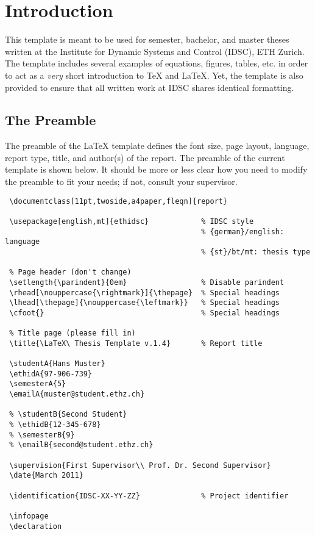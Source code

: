 \chapter{Introduction}\label{sec:introduction}
This template is meant to be used for semester, bachelor, and master theses written at the Institute for Dynamic Systems and Control (IDSC), ETH Zurich. The template includes several examples of equations, figures, tables, etc. in order to act as a {\it very} short introduction to \TeX\! and \LaTeX. Yet, the template is also provided to ensure that all written work at IDSC shares identical formatting.

\section{The Preamble}\label{sec:preamble}
The preamble of the \LaTeX\! template defines the font size, page layout, language, report type, title, and author(s) of the report. The preamble of the current template is shown below. It should be more or less clear how you need to modify the preamble to fit your needs; if not, consult your supervisor.
\begin{verbatim}
 \documentclass[11pt,twoside,a4paper,fleqn]{report}

 \usepackage[english,mt]{ethidsc}            % IDSC style
                                             % {german}/english: language
                                             % {st}/bt/mt: thesis type

 % Page header (don't change)
 \setlength{\parindent}{0em}                 % Disable parindent
 \rhead[\nouppercase{\rightmark}]{\thepage}  % Special headings
 \lhead[\thepage]{\nouppercase{\leftmark}}   % Special headings
 \cfoot{}                                    % Special headings

 % Title page (please fill in)
 \title{\LaTeX\ Thesis Template v.1.4}       % Report title

 \studentA{Hans Muster}
 \ethidA{97-906-739}
 \semesterA{5}
 \emailA{muster@student.ethz.ch}

 % \studentB{Second Student}
 % \ethidB{12-345-678}
 % \semesterB{9}
 % \emailB{second@student.ethz.ch}

 \supervision{First Supervisor\\ Prof. Dr. Second Supervisor}
 \date{March 2011}

 \identification{IDSC-XX-YY-ZZ}              % Project identifier

 \infopage
 \declaration
 \end{verbatim}

